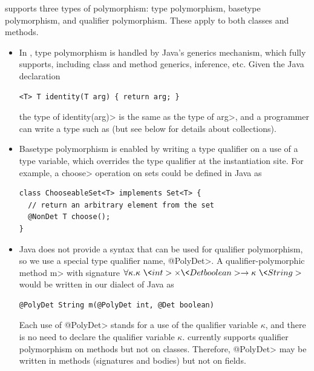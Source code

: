 \OurTypeSystem supports three types of polymorphism:  type
polymorphism, basetype polymorphism, and qualifier polymorphism.
These apply to both classes and methods.
\begin{itemize}
\item
In \theDeterminismCheckerImplementation,
type polymorphism is handled by Java's generics mechanism, which
\theDeterminismChecker fully supports, including class and method generics,
inference, etc.
Given the Java declaration
\begin{Verbatim}
<T> T identity(T arg) { return arg; }
\end{Verbatim}
the type of \<identity(arg)> is the same as the type of
\<arg>, and a programmer can write a type such as  (but see below for details about collections).
\item
Basetype polymorphism is enabled by writing a type qualifier on a use of a
type variable, which overrides the type qualifier at the instantiation
site.
For example, a \<choose> operation on sets could be defined in Java as
\begin{Verbatim}
class ChooseableSet<T> implements Set<T> {
  // return an arbitrary element from the set
  @NonDet T choose();
}
\end{Verbatim}
\item
Java does not provide a syntax that can be used for qualifier polymorphism,
so we use a special type qualifier name, \<@PolyDet>.
A qualifier-polymorphic method \<m> with signature $\forall \kappa . \kappa\ \<int> \times \<Det boolean> \rightarrow
\kappa\ \<String>$ would be written in our dialect of Java as
\begin{Verbatim}
@PolyDet String m(@PolyDet int, @Det boolean)
\end{Verbatim}
Each use of \<@PolyDet> stands for a use of the qualifier variable
$\kappa$, and there is no need to declare the qualifier variable $\kappa$.
\TheDeterminismChecker currently supports
qualifier
polymorphism on methods but not on classes.
Therefore, \<@PolyDet> may be written in methods (signatures and bodies)
but not on fields.
\end{itemize}




